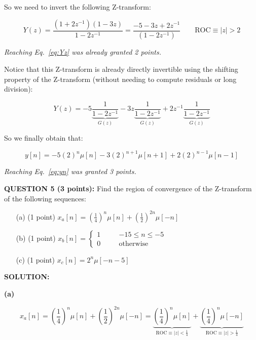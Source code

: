 \documentclass[a4paper,11pt,oneside]{article}
\begin{document}
So we need to invert the following Z-transform:

\begin{equation}\label{eq:Yz}
Y(z)=\frac{(1+2z^{-1})(1-3z)}{1-2z^{-1}}=\frac{-5-3z+2z^{-1}}{(1-2z^{-1})} \qquad \textrm{ROC}\equiv |z|>2 
\end{equation}

\emph{Reaching Eq.~\ref{eq:Yz} was already granted 2 points.}

Notice that this Z-transform is already directly invertible using the shifting property of the Z-transform (without needing to compute residuals or long division):

\[
Y(z)=-5\underbrace{\frac{1}{1-2z^{-1}}}_{G(z)}-3z\underbrace{\frac{1}{1-2z^{-1}}}_{G(z)}+2z^{-1}\underbrace{\frac{1}{1-2z^{-1}}}_{G(z)}
\]

So we finally obtain that:

\begin{equation}\label{eq:yn}
y[n] = -5(2)^n\mu[n]-3(2)^{n+1}\mu[n+1]+2(2)^{n-1}\mu[n-1]
\end{equation}

\emph{Reaching Eq.~\ref{eq:yn} was granted 3 points.}




\vspace{1cm}

\textbf{QUESTION 5 (3 points):} Find the region of convergence of the Z-transform of the following sequences:

\begin{itemize}
\item[(a)] (1 point) $x_a[n]=\left(\frac{1}{4}\right)^n\mu[n]+\left(\frac{1}{2}\right)^{2n}\mu[-n]$
\item[(b)] (1 point) $x_b[n]=\left\{\begin{array}{lll}1 &\quad& -15 \leq n \leq -5\\0 &\quad& \textrm{otherwise} \end{array}\right.$
\item[(c)] (1 point) $x_c[n]=2^n\mu[-n-5]$
\end{itemize}

\vspace{1cm}

\textbf{SOLUTION:}

\textbf{(a)}

\[
x_{a}[n]=\left(\frac{1}{4}\right)^n\mu[n]+\left(\frac{1}{2}\right)^{2n}\mu[-n]=\underbrace{\left(\frac{1}{4}\right)^n\mu[n]}_{\textrm{ROC}\equiv |z|<\frac{1}{4}}+\underbrace{\left(\frac{1}{4}\right)^{n}\mu[-n]}_{\textrm{ROC}\equiv |z|>\frac{1}{4}}
\]
\end{document}
